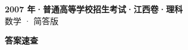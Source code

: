 \documentclass[zihao=-4, a4paper]{ctexart}
\begin{document}
\begin{center}
  {\Large\bfseries 2007 年·普通高等学校招生考试·江西卷·理科}\\[4pt]
  {\large 数学 · 简答版}
\end{center}
\medskip
{}

\clearpage
{}
\begin{center}{\Large\bfseries 答案速查}\end{center}
\medskip

\end{document}
